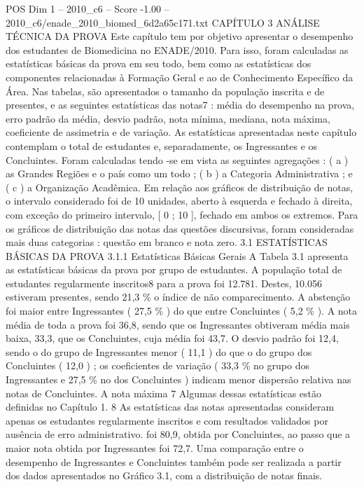 \begin{textsample}{POS Dim 1 – 2010\_c6 – Score -1.00 – 2010\_c6/enade\_2010\_biomed\_6d2a65c171.txt}  \label{ex:f1_pos_165}
CAPÍTULO 3 ANÁLISE TÉCNICA DA PROVA Este capítulo tem por objetivo apresentar o desempenho dos estudantes de Biomedicina no ENADE/2010.
Para isso, foram calculadas as estatísticas básicas da prova em seu todo, bem como as estatísticas dos componentes relacionadas à Formação Geral e ao de Conhecimento Específico da Área.
Nas tabelas, são apresentados o tamanho da população inscrita e de presentes, e as seguintes estatísticas das notas7 : média do desempenho na prova, erro padrão da média, desvio padrão, nota mínima, mediana, nota máxima, coeficiente de assimetria e de variação.
As estatísticas apresentadas neste capítulo contemplam o total de estudantes e, separadamente, os Ingressantes e os Concluintes.
Foram calculadas tendo -se em vista as seguintes agregações : ( a ) as Grandes Regiões e o país como um todo ; ( b ) a Categoria Administrativa ; e ( c ) a Organização Acadêmica.
Em relação aos gráficos de distribuição de notas, o intervalo considerado foi de 10 unidades, aberto à esquerda e fechado à direita, com exceção do primeiro intervalo, [ 0 ; 10 ], fechado em ambos os extremos.
Para os gráficos de distribuição das notas das questões discursivas, foram consideradas mais duas categorias : questão em branco e nota zero. 3.1 ESTATÍSTICAS BÁSICAS DA PROVA 3.1.1 Estatísticas Básicas Gerais A Tabela 3.1 apresenta as estatísticas básicas da prova por grupo de estudantes.
A população total de estudantes regularmente inscritos8 para a prova foi 12.781.
Destes, 10.056 estiveram presentes, sendo 21,3 \% o índice de não comparecimento.
A abstenção foi maior entre Ingressantes ( 27,5 \% ) do que entre Concluintes ( 5,2 \% ).
A nota média de toda a prova foi 36,8, sendo que os Ingressantes obtiveram média mais baixa, 33,3, que os Concluintes, cuja média foi 43,7.
O desvio padrão foi 12,4, sendo o do grupo de Ingressantes menor ( 11,1 ) do que o do grupo dos Concluintes ( 12,0 ) ; os coeficientes de variação ( 33,3 \% no grupo dos Ingressantes e 27,5 \% no dos Concluintes ) indicam menor dispersão relativa nas notas de Concluintes.
A nota máxima 7 Algumas dessas estatísticas estão definidas no Capítulo 1. 8 As estatísticas das notas apresentadas consideram apenas os estudantes regularmente inscritos e com resultados validados por ausência de erro administrativo. foi 80,9, obtida por Concluintes, ao passo que a maior nota obtida por Ingressantes foi 72,7.
Uma comparação entre o desempenho de Ingressantes e Concluintes também pode ser realizada a partir dos dados apresentados no Gráfico 3.1, com a distribuição de notas finais.

\end{textsample}
